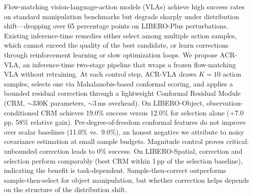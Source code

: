 Flow-matching vision-language-action models (VLAs) achieve high success rates on standard manipulation benchmarks but degrade sharply under distribution shift---dropping over 65 percentage points on LIBERO-Plus perturbations.
Existing inference-time remedies either select among multiple action samples, which cannot exceed the quality of the best candidate, or learn corrections through reinforcement learning or slow optimization loops.
%
We propose ACR-VLA, an inference-time two-stage pipeline that wraps a frozen flow-matching VLA without retraining.
At each control step, ACR-VLA draws $K{=}10$ action samples, selects one via Mahalanobis-based conformal scoring, and applies a bounded residual correction through a lightweight Conformal Residual Module (CRM, ${\sim}$330K parameters, ${\sim}$3\,ms overhead).
%
On LIBERO-Object, observation-conditioned CRM achieves 19.0\% success versus 12.0\% for selection alone (+7.0\,pp, 58\% relative gain).
Per-degree-of-freedom conformal features do not improve over scalar baselines (11.0\% vs.\ 9.0\%), an honest negative we attribute to noisy covariance estimation at small sample budgets.
Magnitude control proves critical: unbounded correction leads to 0\% success.
On LIBERO-Spatial, correction and selection perform comparably (best CRM within 1\,pp of the selection baseline), indicating the benefit is task-dependent.
%
Sample-then-correct outperforms sample-then-select for object manipulation, but whether correction helps depends on the structure of the distribution shift.
